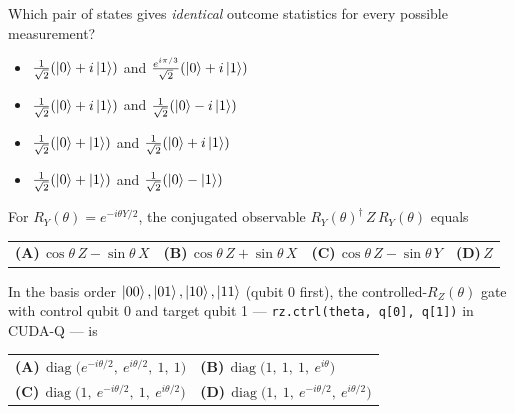 \documentclass[11pt,a4paper]{article}
\newcommand{\optlabel}[1]{\textbf{(#1)}}
\newenvironment{qitem}[1]{\begin{list}{}{\setlength{\leftmargin}{3.3em}\setlength{\labelwidth}{3.1em}%
  \setlength{\labelsep}{0.2em}\setlength{\topsep}{3pt}\setlength{\parsep}{3pt}}\item[\textbf{Q.#1}\hfill]}{\end{list}}
\newcommand{\qsep}{\par\vspace{2pt}{\color{black!15}\hrule}\vspace{4pt}}
\begin{document}
\begin{qitem}{30}
Which pair of states gives \emph{identical} outcome statistics for every possible measurement?
\begin{itemize}[leftmargin=2.6em, labelsep=0.4em, itemsep=2pt, topsep=3pt]
\item[\optlabel{A}] $\frac{1}{\sqrt2}(\ket0 + i\ket1)$ and $\frac{e^{i\pi/3}}{\sqrt2}(\ket0 + i\ket1)$
\item[\optlabel{B}] $\frac{1}{\sqrt2}(\ket0 + i\ket1)$ and $\frac{1}{\sqrt2}(\ket0 - i\ket1)$
\item[\optlabel{C}] $\frac{1}{\sqrt2}(\ket0 + \ket1)$ and $\frac{1}{\sqrt2}(\ket0 + i\ket1)$
\item[\optlabel{D}] $\frac{1}{\sqrt2}(\ket0 + \ket1)$ and $\frac{1}{\sqrt2}(\ket0 - \ket1)$
\end{itemize}
\end{qitem}
\qsep

\begin{qitem}{31}
For $R_Y(\theta) = e^{-i\theta Y/2}$, the conjugated observable $R_Y(\theta)^\dagger\, Z\, R_Y(\theta)$ equals
\par\smallskip\noindent\begin{tabularx}{\linewidth}{@{}*{4}{L}@{}}
\optlabel{A}\,$\cos\theta\,Z - \sin\theta\,X$ & \optlabel{B}\,$\cos\theta\,Z + \sin\theta\,X$ & \optlabel{C}\,$\cos\theta\,Z - \sin\theta\,Y$ & \optlabel{D}\,$Z$
\end{tabularx}
\end{qitem}
\qsep

\begin{qitem}{32}
In the basis order $\ket{00}, \ket{01}, \ket{10}, \ket{11}$ (qubit 0 first), the controlled-$R_Z(\theta)$ gate with
control qubit 0 and target qubit 1 --- \texttt{rz.ctrl(theta, q[0], q[1])} in CUDA-Q --- is
\par\smallskip\noindent\begin{tabularx}{\linewidth}{@{}*{2}{L}@{}}
\optlabel{A}\,$\operatorname{diag}\big(e^{-i\theta/2},\ e^{i\theta/2},\ 1,\ 1\big)$ & \optlabel{B}\,$\operatorname{diag}\big(1,\ 1,\ 1,\ e^{i\theta}\big)$ \\[3pt]
\optlabel{C}\,$\operatorname{diag}\big(1,\ e^{-i\theta/2},\ 1,\ e^{i\theta/2}\big)$ & \optlabel{D}\,$\operatorname{diag}\big(1,\ 1,\ e^{-i\theta/2},\ e^{i\theta/2}\big)$
\end{tabularx}
\end{qitem}
\qsep
\end{document}
